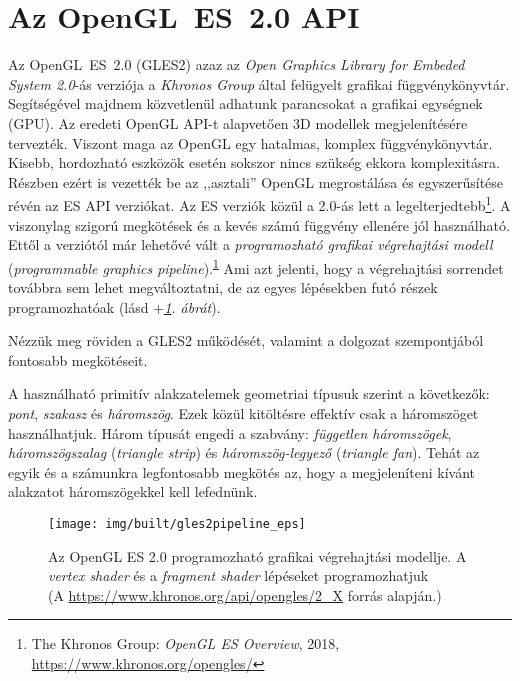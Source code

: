\documentclass[12pt]{report}
\theoremstyle{definition}
\newcommand{\inenglish}[1]{\textsl{#1}}
\begin{document}
    \section{Az OpenGL~ES~2.0 API}
    \label{sec:GLES2:API}

Az OpenGL~ES~2.0 (GLES2) azaz az \emph{Open Graphics Library for Embeded System
2.0}-ás verziója a \emph{Khronos Group} által felügyelt grafikai
függvénykönyvtár.  Segítségével majdnem közvetlenül adhatunk parancsokat a
grafikai egységnek (GPU). Az eredeti OpenGL API-t alapvetően 3D modellek
megjelenítésére tervezték. Viszont maga az OpenGL egy hatalmas, komplex
függvénykönyvtár. Kisebb, hordozható eszközök esetén sokszor nincs szükség
ekkora komplexitásra. Részben ezért is vezették be az ,,asztali'' OpenGL
megrostálása és egyszerűsítése révén az ES API verziókat. Az ES verziók közül a
2.0-ás lett a legelterjedtebb\footnote{The Khronos Group: \emph{OpenGL ES
Overview}, 2018,\\
{\footnotesize\url{https://www.khronos.org/opengles/}}\label{fn:GLES2}}. A
viszonylag szigorú megkötések és a kevés számú függvény ellenére jól
használható. Ettől a verziótól már lehetővé vált a \emph{programozható grafikai
végrehajtási modell} (\inenglish{programmable graphics
pipeline}).\textsuperscript{\ref{fn:GLES2}} Ami azt jelenti, hogy a
végrehajtási sorrendet továbbra sem lehet megváltoztatni, de az egyes
lépésekben futó részek programozhatóak (lásd
\az+\emph{\ref{fig:opengles_20_pipeline2}. ábrát}).

Nézzük meg röviden a GLES2 működését, valamint a dolgozat szempontjából
fontosabb megkötéseit.

A használható primitív alakzatelemek geometriai típusuk szerint a következők:
\emph{pont}, \emph{szakasz} és \emph{háromszög}. Ezek közül kitöltésre effektív
csak a háromszöget használhatjuk. Három típusát engedi a szabvány:
\emph{független háromszögek}, \emph{háromszögszalag} (\inenglish{triangle
strip}) és \emph{háromszög-legyező} (\inenglish{triangle fan}). Tehát az egyik
és a számunkra legfontosabb megkötés az, hogy a megjeleníteni kívánt alakzatot
háromszögekkel kell lefednünk.

  \begin{figure}
    \texttt{[image: img/built/gles2pipeline\_eps]}
    \caption{\label{fig:opengles_20_pipeline2} Az OpenGL ES 2.0 programozható
    grafikai végrehajtási modellje. A \emph{vertex shader} és a \emph{fragment
    shader} lépéseket programozhatjuk \\%
    (A {\footnotesize\url{https://www.khronos.org/api/opengles/2_X}}
    forrás alapján.)}
  \end{figure}
\end{document}
